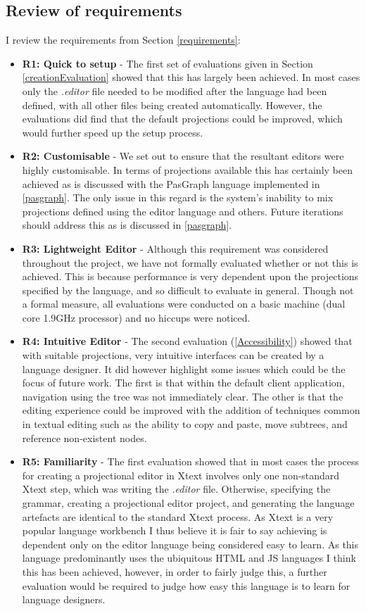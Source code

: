\documentclass{article}
\begin{document}
{\subsection{Review of requirements}
I review the requirements from Section \ref{requirements}:
\begin{itemize}
\item \textbf{R1: Quick to setup} - The first set of evaluations given in Section \ref{creationEvaluation} showed that this has largely been achieved. In most cases only the \emph{.editor} file needed to be modified after the language had been defined, with all other files being created automatically. However, the evaluations did find that the default projections could be improved, which would further speed up the setup process.
\item \textbf{R2: Customisable} - We set out to ensure that the resultant editors were highly customisable. In terms of projections available this has certainly been achieved as is discussed with the PasGraph language implemented in \ref{pasgraph}. The only issue in this regard is the system's inability to mix projections defined using the editor language and others. Future iterations should address this as is discussed in \ref{pasgraph}.  
\item \textbf{R3: Lightweight Editor} - Although this requirement was considered throughout the project, we have not formally evaluated whether or not this is achieved. This is because performance is very dependent upon the projections specified by the language, and so difficult to evaluate in general. Though not a formal measure, all evaluations were conducted on a basic machine (dual core 1.9GHz processor) and no hiccups were noticed. 
\item \textbf{R4: Intuitive Editor} - The second evaluation (\ref{Accessibility}) showed that with suitable projections, very intuitive interfaces can be created by a language designer. It did however highlight some issues which could be the focus of future work. The first is that within the default client application, navigation using the tree was not immediately clear. The other is that the editing experience could be improved with the addition of techniques common in textual editing such as the ability to copy and paste, move subtrees, and reference non-existent nodes.
\item \textbf{R5: Familiarity} - The first evaluation showed that in most cases the process for creating a projectional editor in Xtext involves only one non-standard Xtext step, which was writing the \emph{.editor} file. Otherwise, specifying the grammar, creating a projectional editor project, and generating the language artefacts are identical to the standard Xtext process. As Xtext is a very popular language workbench I thus believe it is fair to say achieving \RFamiliarity is dependent only on the editor language being considered easy to learn. As this language predominantly uses the ubiquitous HTML and JS languages I think this has been achieved, however, in order to fairly judge this, a further evaluation would be required to judge how easy this language is to learn for language designers.
\end{itemize}

}
\end{document}
